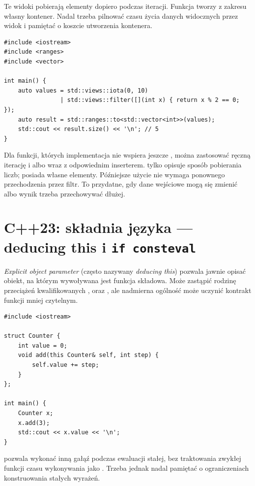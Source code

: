 Te widoki pobierają elementy dopiero podczas iteracji. Funkcja
 tworzy z zakresu własny kontener. Nadal trzeba
pilnować czasu życia danych widocznych przez widok i pamiętać
o koszcie utworzenia kontenera.

\begin{lstlisting}[caption={Przekazanie wynikow widoku do wektora (C++23).}]
#include <iostream>
#include <ranges>
#include <vector>

int main() {
    auto values = std::views::iota(0, 10)
                | std::views::filter([](int x) { return x % 2 == 0; });
    auto result = std::ranges::to<std::vector<int>>(values);
    std::cout << result.size() << '\n'; // 5
}
\end{lstlisting}

Dla funkcji, których implementacja nie wspiera jeszcze ,
można zastosować ręczną iterację i  albo
 wraz z odpowiednim inserterem.
 tylko opisuje sposób pobierania liczb; 
posiada własne elementy. Późniejsze użycie  nie wymaga
ponownego przechodzenia przez filtr. To przydatne, gdy dane wejściowe
mogą się zmienić albo wynik trzeba przechowywać dłużej.

\section{C++23: składnia języka --- deducing this i \texttt{if consteval}}

\emph{Explicit object parameter} (często nazywany \emph{deducing this})
pozwala jawnie opisać obiekt, na którym wywoływana jest funkcja
składowa. Może zastąpić rodzinę przeciążeń kwalifikowanych
\code{&},  oraz \code{&&}, ale nadmierna ogólność
może uczynić kontrakt funkcji mniej czytelnym.

\begin{lstlisting}[caption={Jawny parametr obiektu (C++23).}]
#include <iostream>

struct Counter {
    int value = 0;
    void add(this Counter& self, int step) {
        self.value += step;
    }
};

int main() {
    Counter x;
    x.add(3);
    std::cout << x.value << '\n';
}
\end{lstlisting}

 pozwala wykonać inną gałąź podczas ewaluacji
stałej, bez traktowania zwykłej funkcji czasu wykonywania jako
. Trzeba jednak nadal pamiętać o ograniczeniach
konstruowania stałych wyrażeń.

